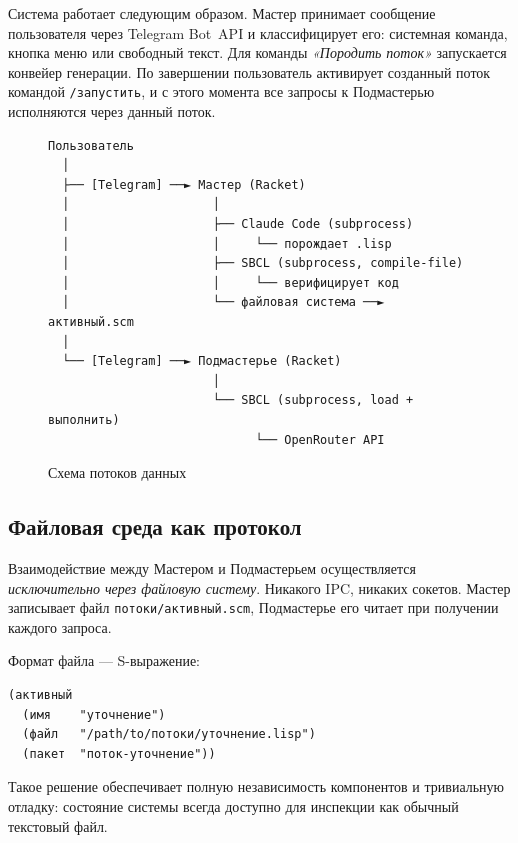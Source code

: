 \documentclass[11pt,a4paper]{article}
\begin{document}
Система работает следующим образом. Мастер принимает сообщение пользователя через
Telegram Bot~API и классифицирует его: системная команда, кнопка меню или свободный
текст. Для команды \emph{«Породить поток»} запускается конвейер генерации. По
завершении пользователь активирует созданный поток командой \texttt{/запустить},
и с этого момента все запросы к Подмастерью исполняются через данный поток.

\begin{figure}[H]
\centering
\begin{mdframed}[linecolor=gray!60,backgroundcolor=gray!5]
\ttfamily\small
\begin{verbatim}
Пользователь
  │
  ├── [Telegram] ──► Мастер (Racket)
  │                    │
  │                    ├── Claude Code (subprocess)
  │                    │     └── порождает .lisp
  │                    ├── SBCL (subprocess, compile-file)
  │                    │     └── верифицирует код
  │                    └── файловая система ──► активный.scm
  │
  └── [Telegram] ──► Подмастерье (Racket)
                       │
                       └── SBCL (subprocess, load + выполнить)
                             └── OpenRouter API
\end{verbatim}
\end{mdframed}
\caption{Схема потоков данных}
\end{figure}

\subsection{Файловая среда как протокол}

Взаимодействие между Мастером и Подмастерьем осуществляется \emph{исключительно
через файловую систему}. Никакого IPC, никаких сокетов. Мастер записывает файл
\texttt{потоки/активный.scm}, Подмастерье его читает при получении каждого запроса.

Формат файла — S-выражение:

\begin{lstlisting}[language=Racket, caption={Файл активного потока \texttt{активный.scm}}]
(активный
  (имя    "уточнение")
  (файл   "/path/to/потоки/уточнение.lisp")
  (пакет  "поток-уточнение"))
\end{lstlisting}

Такое решение обеспечивает полную независимость компонентов и тривиальную отладку:
состояние системы всегда доступно для инспекции как обычный текстовый файл.

\end{document}
